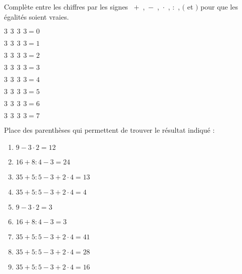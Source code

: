 \begin{exercice}
Complète entre les chiffres par les signes  \textcolor{B2}{$+$} , \textcolor{B2}{$-$} , \textcolor{B2}{$\cdot$} , \textcolor{B2}{$:$} , \textcolor{B2}{$($} et \textcolor{B2}{$)$} pour que les égalités soient vraies.
\begin{colenumerate}{3}
 \item $3 \hspace{5pt} 3  \hspace{5pt} 3  \hspace{5pt} 3 = 0$
 \item $3 \hspace{5pt} 3 \hspace{5pt} 3 \hspace{5pt} 3 = 1$
 \item $3 \hspace{5pt} 3 \hspace{5pt} 3 \hspace{5pt} 3 = 2$
 \item $3 \hspace{5pt} 3 \hspace{5pt} 3 \hspace{5pt} 3 = 3$
 \item $3 \hspace{5pt} 3 \hspace{5pt} 3 \hspace{5pt} 3 = 4$
 \item $3 \hspace{5pt} 3 \hspace{5pt} 3 \hspace{5pt} 3 = 5$
 \item $3 \hspace{5pt} 3 \hspace{5pt} 3 \hspace{5pt} 3 = 6$
 \item $3 \hspace{5pt} 3 \hspace{5pt} 3 \hspace{5pt} 3 = 7$
 \end{colenumerate}
\end{exercice}


\begin{exercice}
Place des parenthèses qui permettent de trouver le résultat indiqué :
\begin{enumerate}
 \item $9 - 3 \cdot 2 = 12$
 \item $16 + 8 : 4 - 3 = 24$
 \item $35 + 5 : 5 - 3 + 2 \cdot 4 = 13$
 \item $35 + 5 : 5 - 3 + 2 \cdot 4 = 4$
 \item $9 - 3 \cdot 2 = 3$
 \item $16 + 8 : 4 - 3 = 3$
 \item $35 + 5 : 5 - 3 + 2 \cdot 4 = 41$
 \item $35 + 5 : 5 - 3 + 2 \cdot 4 = 28$
 \item $35 + 5 : 5 - 3 + 2 \cdot 4 = 16$
 \end{enumerate}
\end{exercice}


